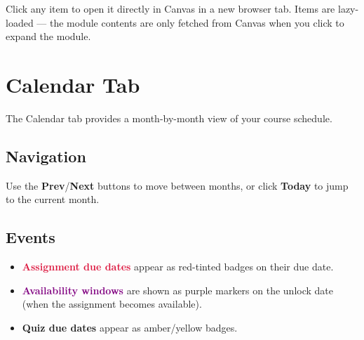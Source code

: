 \documentclass[12pt,letterpaper]{article}
\begin{document}
\begin{tipbox}
Click any item to open it directly in Canvas in a new browser tab. Items are lazy-loaded — the module contents are only fetched from Canvas when you click to expand the module.
\end{tipbox}


\section{Calendar Tab}

The Calendar tab provides a month-by-month view of your course schedule.

\subsection{Navigation}

Use the \textbf{Prev}/\textbf{Next} buttons to move between months, or click \textbf{Today} to jump to the current month.

\subsection{Events}

\begin{itemize}[leftmargin=*]
    \item \textcolor{crimson}{\textbf{Assignment due dates}} appear as red-tinted badges on their due date.
    \item \textcolor{purple}{\textbf{Availability windows}} are shown as purple markers on the unlock date (when the assignment becomes available).
    \item \textcolor{amber}{\textbf{Quiz due dates}} appear as amber/yellow badges.
\end{itemize}
\end{document}
